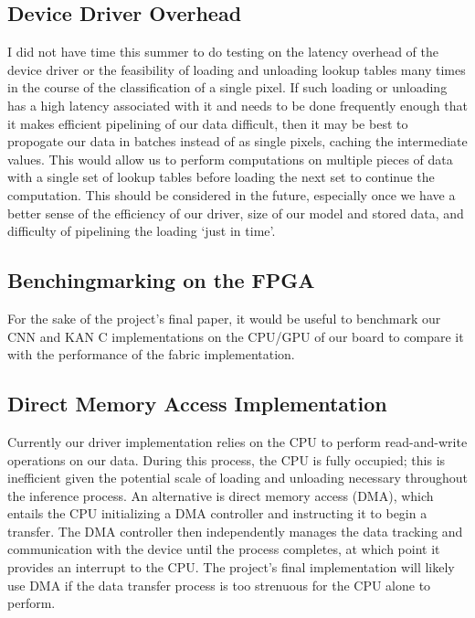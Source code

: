 \documentclass[psamsfonts]{amsart}
\theoremstyle{definition}
\theoremstyle{remark}
\numberwithin{equation}{section}
\begin{document}
\subsection{Device Driver Overhead}
I did not have time this summer to do testing on the latency overhead of the device driver or the feasibility of loading and unloading lookup tables many times in the course of the classification of a single pixel. If such loading or unloading has a high latency associated with it and needs to be done frequently enough that it makes efficient pipelining of our data difficult, then it may be best to propogate our data in batches instead of as single pixels, caching the intermediate values. This would allow us to perform computations on multiple pieces of data with a single set of lookup tables before loading the next set to continue the computation. This should be considered in the future, especially once we have a better sense of the efficiency of our driver, size of our model and stored data, and difficulty of pipelining the loading `just in time'.

\subsection{Benchingmarking on the FPGA}
For the sake of the project's final paper, it would be useful to benchmark our CNN and KAN C implementations on the CPU/GPU of our board to compare it with the performance of the fabric implementation.

\subsection{Direct Memory Access Implementation}
Currently our driver implementation relies on the CPU to perform read-and-write operations on our data. During this process, the CPU is fully occupied; this is inefficient given the potential scale of loading and unloading necessary throughout the inference process. An alternative is direct memory access (DMA), which entails the CPU initializing a DMA controller and instructing it to begin a transfer. The DMA controller then independently manages the data tracking and communication with the device until the process completes, at which point it provides an interrupt to the CPU. The project's final implementation will likely use DMA if the data transfer process is too strenuous for the CPU alone to perform.
\end{document}
